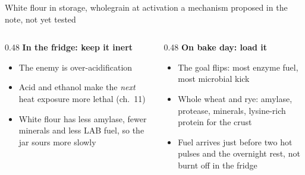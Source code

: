 \documentclass[aspectratio=169,11pt]{beamer}
\newcommand{\hypline}{{\small\hypothesis{} {\color{muted}a mechanism proposed in the note, not yet tested}}\par\smallskip}
\begin{document}
\begin{frame}{White flour in storage, wholegrain at activation}
  \hypline
  \begin{columns}[T,onlytextwidth]
    \begin{column}{0.48\textwidth}
      \textbf{\color{coldline}In the fridge: keep it inert}
      \begin{itemize}\small
        \item The enemy is over-acidification
        \item Acid and ethanol make the \emph{next} heat exposure more lethal (ch.~11)
        \item White flour has less amylase, fewer minerals and less LAB fuel, so the jar sours more slowly
      \end{itemize}
    \end{column}
    \begin{column}{0.48\textwidth}
      \textbf{\color{crust}On bake day: load it}
      \begin{itemize}\small
        \item The goal flips: most enzyme fuel, most microbial kick
        \item Whole wheat and rye: amylase, protease, minerals, lysine-rich protein for the crust
        \item Fuel arrives just before two hot pulses and the overnight rest, not burnt off in the fridge
      \end{itemize}
    \end{column}
  \end{columns}
\end{frame}
\end{document}
